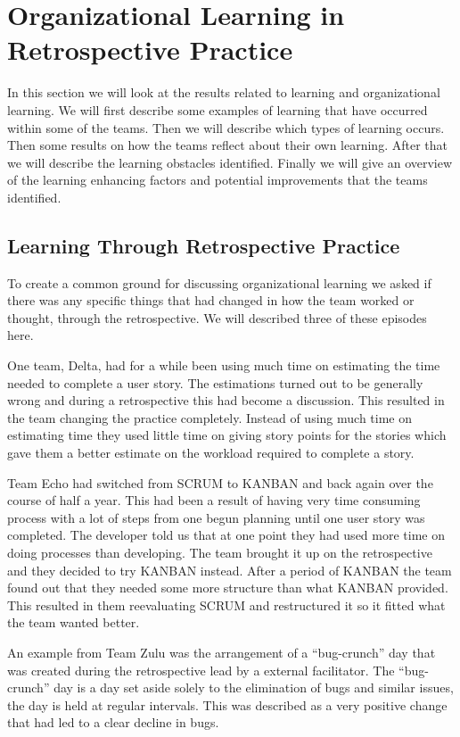 \clearpage

\section{Organizational Learning in Retrospective Practice}
In this section we will look at the results related to learning and organizational learning. We will first describe some examples of learning that have occurred within some of the teams. Then we will describe which types of learning occurs. Then some results on how the teams reflect about their own learning. After that we will describe the learning obstacles identified. Finally we will give an overview of the learning enhancing factors and potential improvements that the teams identified. 

\subsection{Learning Through Retrospective Practice}
\label{question-11}
To create a common ground for discussing organizational learning we asked if there was any specific things that had changed in how the team worked or thought, through the retrospective. We will described three of these episodes here. 

One team, Delta, had for a while been using much time on estimating the time needed to complete a user story. The estimations turned out to be generally wrong and during a retrospective this had become a discussion. This resulted in the team changing the practice completely. Instead of using much time on estimating time they used little time on giving story points for the stories which gave them a better estimate on the workload required to complete a story. 

Team Echo had switched from SCRUM to KANBAN and back again over the course of half a year. This had been a result of having very time consuming process with a lot of steps from one begun planning until one user story was completed. The developer told us that at one point they had used more time on doing processes than developing. The team brought it up on the retrospective and they decided to try KANBAN instead. After a period of KANBAN the team found out that they needed some more structure than what KANBAN provided. This resulted in them reevaluating SCRUM and restructured it so it fitted what the team wanted better. 

An example from Team Zulu was the arrangement of a ``bug-crunch'' day that was created during the retrospective lead by a external facilitator. The ``bug-crunch'' day is a day set aside solely to the elimination of bugs and similar issues, the day is held at regular intervals. This was described as a very positive change that had led to a clear decline in bugs. 

